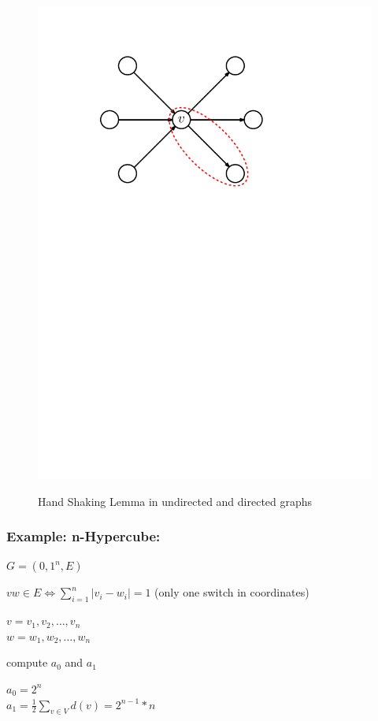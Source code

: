 \begin{figure}[htb]
{	\includegraphics[scale=.5]{01_graph_theory/pics/directed-graph_degree_handshaking-lemma.pdf}
}
\caption{Hand Shaking Lemma in undirected and directed graphs}
\end{figure}
\FloatBarrier

\subsubsection*{Example: n-Hypercube:}
$G = ({0,1}^n, E)$

$vw \in E \Leftrightarrow \sum_{i=1}^{n} |v_i - w_i | = 1$ (only one switch in coordinates)

$v = v_1, v_2, \ldots , v_n$\\
$w = w_1, w_2, \ldots , w_n$

compute $a_0$ and $a_1$

$a_0 = 2^n$ \\
$a_1 = \frac{1}{2} \sum_{v \in V} d(v) = 2^{n-1} * n$

